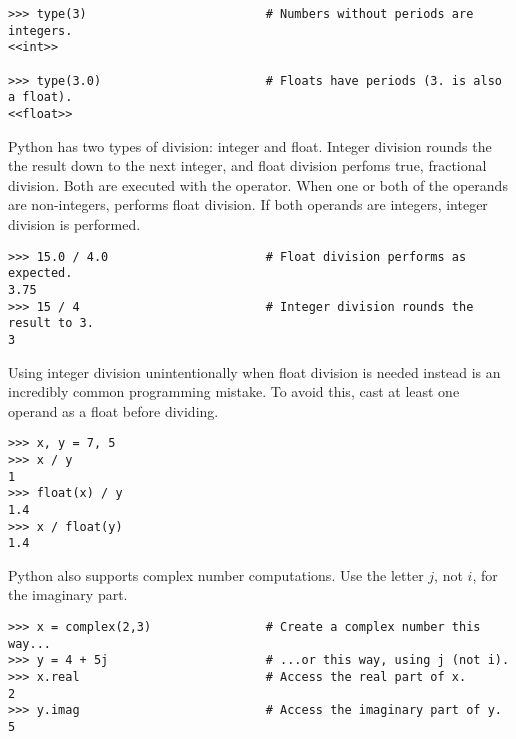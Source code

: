 \begin{lstlisting}
>>> type(3)                         # Numbers without periods are integers.
<<int>>

>>> type(3.0)                       # Floats have periods (3. is also a float).
<<float>>
\end{lstlisting}

Python has two types of division: integer and float.
Integer division rounds the the result down to the next integer, and float division perfoms true, fractional division.
Both are executed  with the \li{/} operator.
When one or both of the operands are non-integers, \li{/} performs float division.
If both operands are integers, integer division is performed.

\begin{lstlisting}
>>> 15.0 / 4.0                      # Float division performs as expected.
3.75
>>> 15 / 4                          # Integer division rounds the result to 3.
3
\end{lstlisting}

\begin{warn} %
Using integer division unintentionally when float division is needed instead is an incredibly common programming mistake.
To avoid this, cast at least one operand as a float before dividing.
\begin{lstlisting}
>>> x, y = 7, 5
>>> x / y
1
>>> float(x) / y
1.4
>>> x / float(y)
1.4
\end{lstlisting}
\end{warn}

Python also supports complex number computations.
Use the letter $j$, not $i$, for the imaginary part.
\begin{lstlisting}
>>> x = complex(2,3)                # Create a complex number this way...
>>> y = 4 + 5j	                    # ...or this way, using j (not i).
>>> x.real                          # Access the real part of x.
2
>>> y.imag                          # Access the imaginary part of y.
5
\end{lstlisting}


